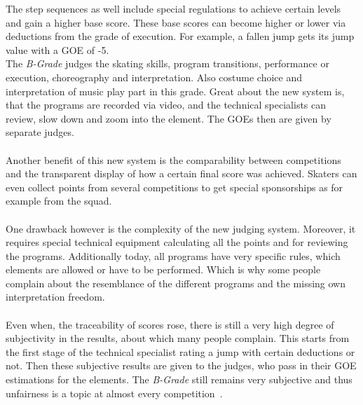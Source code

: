 The step sequences as well include special regulations to achieve certain levels and gain a higher base score.
These base scores can become higher or lower via deductions from the grade of execution.
For example, a fallen jump gets its jump value with a GOE of -5.\\
The \textit{B-Grade} judges the skating skills, program transitions, performance or execution, choreography and
interpretation.
Also costume choice and interpretation of music play part in this grade.
Great about the new system is, that the programs are recorded via video, and the technical specialists can review,
slow down
and zoom into the element.
The GOEs then are given by separate judges.
\\\mbox{}\\
Another benefit of this new system is the comparability between competitions and the transparent display of how a
certain final
score was achieved.
Skaters can even collect points from several competitions to get special sponsorships as for example from the squad.
\\\mbox{}\\
One drawback however is the complexity of the new judging system.
Moreover, it requires special technical equipment calculating all the points and for reviewing the programs.
Additionally today, all programs have very specific rules, which elements are allowed or have to be performed.
Which is why some people complain about the resemblance of the different programs and the missing own interpretation
freedom.
\\\mbox{}\\
Even when, the traceability of scores rose, there is still a very high degree of subjectivity in the results,
about which many people complain.
This starts from the first stage of the technical specialist rating a jump with certain deductions or not.
Then these subjective results are given to the judges, who pass in their GOE estimations for the elements.
The \textit{B-Grade} still remains very subjective and thus unfairness is a topic at almost every
competition~\cite{unfairjudge, isujudginssystem, isuguideleinesgoe}.
